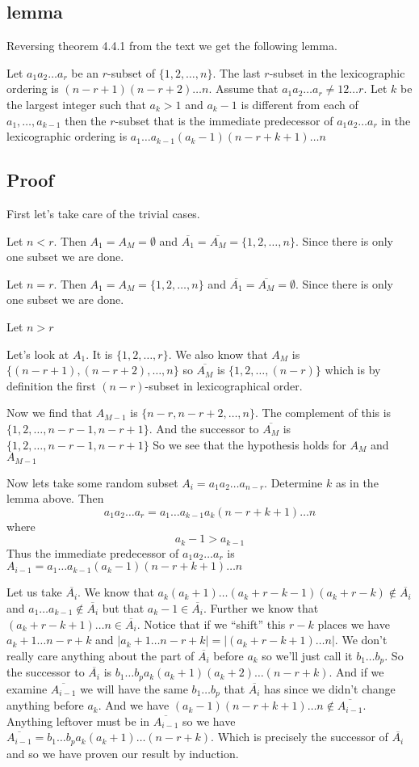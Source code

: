 \documentclass{article}
\begin{document}
\subsection*{lemma}
Reversing theorem 4.4.1 from the text we get the following lemma.

Let $a_1a_2\dots a_r$ be an $r$-subset of $\{1,2,\dots,n\}$. The last $r$-subset in the lexicographic ordering is $(n-r+1)(n-r+2)\dots n$. Assume that $a_1a_2\dots a_r\neq 12\dots r$. Let $k$ be the largest integer such that $a_k>1$ and $a_k-1$ is different from each of $a_1,\dots,a_{k-1}$ then the $r$-subset that is the immediate predecessor of $a_1a_2\dots a_r$ in the lexicographic ordering is $a_1\dots a_{k-1}(a_k-1)(n-r+k+1)\dots n$
\subsection*{Proof}
First let's take care of the trivial cases.

Let $n<r$. Then $A_1=A_M=\emptyset$ and $\overline{A_1}=\overline{A_M}=\{1,2,\dots,n\}$. Since there is only one subset we are done.

Let $n=r$. Then $A_1=A_M=\{1,2,\dots,n\}$ and $\overline{A_1}=\overline{A_M}=\emptyset$. Since there is only one subset we are done.

Let $n>r$

Let's look at $A_1$. It is $\{1,2,\dots,r\}$. We also know that $A_M$ is $\{(n-r+1),(n-r+2),\dots,n\}$ so $\overline{A_M}$ is $\{1,2,\dots,(n-r)\}$ which is by definition the first $(n-r)$-subset in lexicographical order.

Now we find that $A_{M-1}$ is $\{n-r,n-r+2,\dots,n\}$. The complement of this is $\{1,2,\dots,n-r-1,n-r+1\}$. And the successor to $\overline{A_M}$ is $\{1,2,\dots,n-r-1,n-r+1\}$ So we see that the hypothesis holds for $A_M$ and $A_{M-1}$

Now lets take some random subset $A_i=a_1a_2\dots a_{n-r}$. Determine $k$ as in the lemma above. Then
\[a_1a_2\dots a_r=a_1\dots a_{k-1}a_k(n-r+k+1)\dots n\]
where \[a_k-1>a_{k-1}\]
Thus the immediate predecessor of $a_1a_2\dots a_r$ is $A_{i-1}=a_1\dots a_{k-1}(a_k-1)(n-r+k+1)\dots n$

Let us take $\overline{A_{i}}$. We know that $a_k(a_k+1)\dots (a_k+r-k-1)(a_k+r-k)\not\in\overline{A_i}$ and $a_1\dots a_{k-1}\not\in\overline{A_i}$ but that $a_k-1\in\overline{A_i}$. Further we know that $(a_k+r-k+1)\dots n\in\overline{A_i}$. Notice that if we ``shift'' this $r-k$ places we have $a_k+1\dots n-r+k$ and $|a_k+1\dots n-r+k|=|(a_k+r-k+1)\dots n|$. We don't really care anything about the part of $\overline{A_i}$ before $a_k$ so we'll just call it $b_1\dots b_p$. So the successor to $\overline{A_i}$ is $b_1\dots b_pa_k(a_k+1)(a_k+2)\dots (n-r+k)$.
And if we examine $\overline{A_{i-1}}$ we will have the same $b_1\dots b_p$ that $\overline{A_i}$ has since we didn't change anything before $a_k$. And we have $(a_k-1)(n-r+k+1)\dots n\not\in\overline{A_{i-1}}$. Anything leftover must be in $\overline{A_{i-1}}$ so we have $\overline{A_{i-1}}=b_1\dots b_pa_k(a_k+1)\dots(n-r+k)$. Which is precisely the successor of $\overline{A_i}$ and so we have proven our result by induction.
\end{document}
